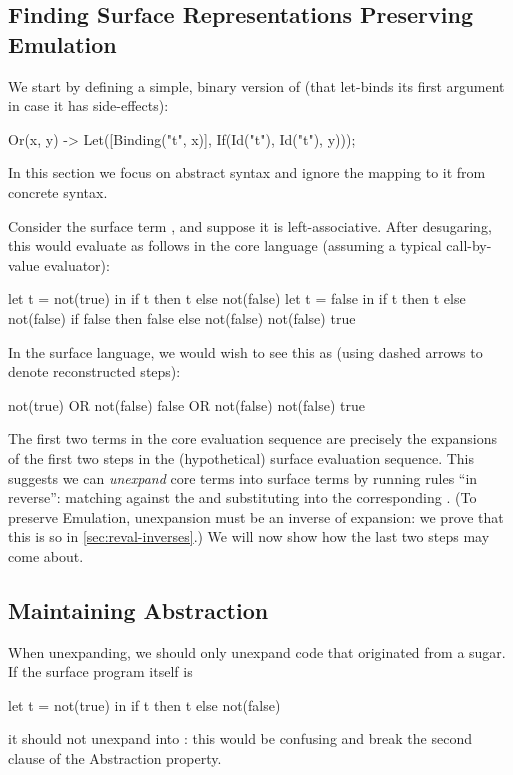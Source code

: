 \subsection{Finding Surface Representations Preserving Emulation}

We start by defining a simple, binary version of  (that
let-binds its first argument in case it has side-effects):
\begin{Codes}
Or(x, y) -> Let([Binding("t", x)],
                If(Id("t"), Id("t"), y)));
\end{Codes}
In this section we focus on abstract syntax and ignore
the mapping to it from concrete syntax.

Consider the surface term , and suppose
it is left-associative. After
desugaring, this would evaluate as follows in the core language
(assuming a typical call-by-value evaluator):
\begin{Codes}
    let t = not(true) in
      if t then t else not(false)
\CoreStep let t = false in
      if t then t else not(false)
\CoreStep if false then false else not(false)
\CoreStep not(false)
\CoreStep true
\end{Codes}
In the surface language, we would wish to see this as (using dashed
arrows to denote reconstructed steps):
\begin{Codes}
    not(true) OR not(false)
\SurfStep false OR not(false)
\SurfStep not(false)
\SurfStep true
\end{Codes}
The first two terms in the core evaluation sequence are precisely the
expansions of the first two steps in the (hypothetical) surface evaluation
sequence. This suggests
we can \emph{unexpand} core terms into surface terms by running rules ``in
reverse'': matching against the  and substituting into the
corresponding .
(To preserve Emulation, unexpansion must be an inverse of expansion: we
prove that this is so in \cref{sec:reval-inverses}.)
We will now show how the last two steps
may come about.

\subsection{Maintaining Abstraction}
\label{sec:reval-exposition-tagging}

When unexpanding, we should only unexpand code that
originated from a sugar. If the surface program itself is
\begin{Codes}
let t = not(true) in
  if t then t else not(false)
\end{Codes}
it should not unexpand into :
this would be confusing and break the second clause of the Abstraction property.

